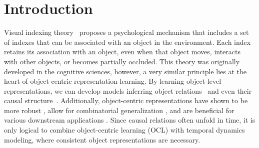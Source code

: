\section{Introduction}


Visual indexing theory~\cite{pylyshyn1989role} proposes a psychological mechanism that includes a set of indexes that can be associated with an object in the environment. 
Each index retains its association with an object, even when that object moves, interacts with other objects, or becomes partially occluded. 
This theory was originally developed in the cognitive sciences, however, a very similar principle lies at the heart of object-centric representation learning.
By learning object-level representations, we can develop models inferring object relations~\cite{mambelli2022compositional,wu2022slotformer,yoon2023investigation} and even their causal structure~\cite{liu2023causal,mansouri2022object}. 
Additionally, object-centric representations have shown to be more robust \cite{dittadi2022generalization}, allow for combinatorial generalization \cite{liu2023causal}, and are beneficial for various downstream applications \cite{wu2022slotformer}.
Since causal relations often unfold in time, it is only logical to combine object-centric learning (OCL) with temporal dynamics modeling, where consistent object representations are necessary.


